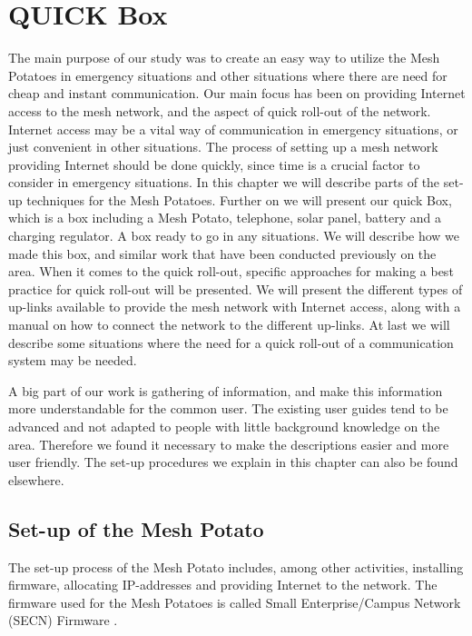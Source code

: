 \chapter{QUICK Box}
\label{chp:quickrollout} 

The main purpose of our study was to create an easy way to utilize the Mesh Potatoes in emergency situations and other situations where there are need for cheap and instant communication. Our main focus has been on providing Internet access to the mesh network, and the aspect of quick roll-out of the network. Internet access may be a vital way of communication in emergency situations, or just convenient in other situations. The process of setting up a mesh network providing Internet should be done quickly, since time is a crucial factor to consider in emergency situations. In this chapter we will describe parts of the set-up techniques for the Mesh Potatoes. Further on we will present our \gls{quick} Box, which is a box including a Mesh Potato, telephone, solar panel, battery and a charging regulator. A box ready to go in any situations. We will describe how we made this box, and similar work that have been conducted previously on the area. When it comes to the quick roll-out, specific approaches for making a best practice for quick roll-out will be presented. We will present the different types of up-links available to provide the mesh network with Internet access, along with a manual on how to connect the network to the different up-links. At last we will describe some situations where the need for a quick roll-out of a communication system may be needed. 

A big part of our work is gathering of information, and make this information more understandable for the common user. The existing user guides tend to be advanced and not adapted to people with little background knowledge on the area. Therefore we found it necessary to make the descriptions easier and more user friendly. The set-up procedures we explain in this chapter can also be found elsewhere. 


\section{Set-up of the Mesh Potato}
The set-up process of the Mesh Potato includes, among other activities, installing firmware, allocating IP-addresses and providing Internet to the network. The firmware used for the Mesh Potatoes is called Small Enterprise/Campus Network (SECN) Firmware \cite{ChoosingFirmware}. 

